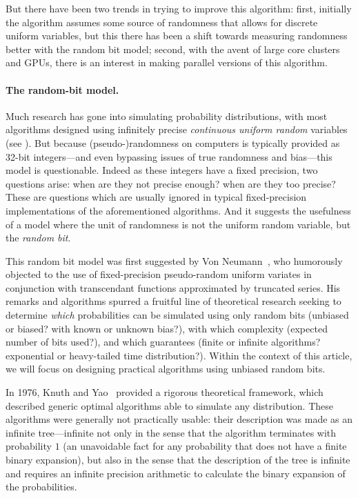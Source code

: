 \documentclass[letter,11pt,en]{quick-document}
\begin{document}
But there have been two trends in trying to improve this algorithm: first,
initially the algorithm assumes some source of randomness that allows for
discrete uniform variables, but this there has been a shift towards
measuring randomness better with the random bit model; second, with the
avent of large core clusters and GPUs, there is an interest in making
parallel versions of this algorithm.

\paragraph{The random-bit model.}

Much research has gone into simulating probability distributions, with
most algorithms designed using infinitely precise \emph{continuous uniform
  random} variables (see \cite[II.3.7]{Devroye86}). But because
(pseudo-)randomness on computers is typically provided as 32-bit
integers---and even bypassing issues of true randomness and bias---this
model is questionable. Indeed as these integers have a fixed precision,
two questions arise: when are they not precise enough? when are they too
precise? These are questions which are usually ignored in typical
fixed-precision implementations of the aforementioned algorithms. And it
suggests the usefulness of a model where the unit of randomness is not the
uniform random variable, but the \emph{random bit}.

This random bit model was first suggested by Von Neumann~\cite{Neumann51},
who humorously objected to the use of fixed-precision pseudo-random
uniform variates in conjunction with transcendant functions approximated
by truncated series. His remarks and algorithms spurred a fruitful line of
theoretical research seeking to determine \emph{which} probabilities can
be simulated using only random bits (unbiased or biased? with known or
unknown bias?), with which complexity (expected number of bits used?), and
which guarantees (finite or infinite algorithms? exponential or
heavy-tailed time distribution?). Within the context of this article, we
will focus on designing practical algorithms using unbiased random bits.

In 1976, Knuth and Yao~\cite{KnYa76} provided a rigorous theoretical
framework, which described generic optimal algorithms able to simulate any
distribution. These algorithms were generally not practically usable:
their description was made as an infinite tree---infinite not only in the
sense that the algorithm terminates with probability $1$ (an unavoidable
fact for any probability that does not have a finite binary expansion),
but also in the sense that the description of the tree is infinite and
requires an infinite precision arithmetic to calculate the binary
expansion of the probabilities.
\end{document}
